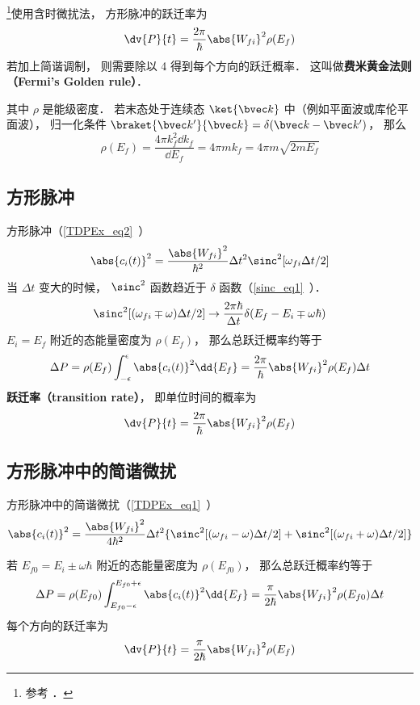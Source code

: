 

\footnote{参考 \cite{Brandsen}．}使用含时微扰法， 方形脉冲的跃迁率为
\begin{equation} %
\dv{P}{t} = \frac{2\pi}{\hbar} \abs{W_{fi}}^2\rho(E_f)
\end{equation}
若加上简谐调制， 则需要除以 4 得到每个方向的跃迁概率． 这叫做\textbf{费米黄金法则（Fermi's Golden rule）}．

其中 $\rho$ 是能级密度． 若末态处于连续态 $\ket{\bvec k}$ 中（例如平面波或库伦平面波）， 归一化条件 $\braket{\bvec k'}{\bvec k} = \delta(\bvec k - \bvec k')$， 那么
\begin{equation}
\rho(E_f) = \frac{4\pi k_f^2\dd{k_f}}{\dd{E_f}} = 4\pi m k_f = 4\pi m\sqrt{2mE_f}
\end{equation}

\subsection{方形脉冲}
方形脉冲（\autoref{TDPEx_eq2}~）
\begin{equation}
\abs{c_i(t)}^2 = \frac{\abs{W_{fi}}^2}{\hbar^2} \Delta t^2 \sinc^2[\omega_{fi}\Delta t/2]
\end{equation}
当 $\Delta t$ 变大的时候， $\sinc^2$ 函数趋近于 $\delta$ 函数（\autoref{sinc_eq1}~）．
\begin{equation}
\sinc^2[(\omega_{fi}\mp\omega)\Delta t/2] \to \frac{2\pi\hbar}{\Delta t}\delta(E_f - E_i \mp \omega\hbar)
\end{equation}
$E_i=E_f$ 附近的态能量密度为 $\rho(E_f)$， 那么总跃迁概率约等于
\begin{equation}
\Delta P = \rho(E_f)\int_{-\epsilon}^{\epsilon}\abs{c_i(t)}^2 \dd{E_f}
= \frac{2\pi}{\hbar} \abs{W_{fi}}^2\rho(E_f)\Delta t
\end{equation}
\textbf{跃迁率（transition rate）}， 即单位时间的概率为
\begin{equation}
\dv{P}{t} = \frac{2\pi}{\hbar} \abs{W_{fi}}^2\rho(E_f)
\end{equation}

\subsection{方形脉冲中的简谐微扰}
方形脉冲中的简谐微扰（\autoref{TDPEx_eq1}~）
\begin{equation}
\abs{c_i(t)}^2 = \frac{\abs{W_{fi}}^2}{4\hbar^2} \Delta t^2 \{\sinc^2[(\omega_{fi}-\omega)\Delta t/2] + \sinc^2[(\omega_{fi}+\omega)\Delta t/2]\}
\end{equation}

若 $E_{f0} = E_i \pm \omega\hbar$ 附近的态能量密度为 $\rho(E_{f0})$， 那么总跃迁概率约等于
\begin{equation}
\Delta P = \rho(E_{f0})\int_{E_{f0}-\epsilon}^{E_{f0}+\epsilon}\abs{c_i(t)}^2 \dd{E_f}
= \frac{\pi}{2\hbar} \abs{W_{fi}}^2\rho(E_{f0})\Delta t
\end{equation}
每个方向的跃迁率为
\begin{equation}
\dv{P}{t} = \frac{\pi}{2\hbar} \abs{W_{fi}}^2\rho(E_{f})
\end{equation}
